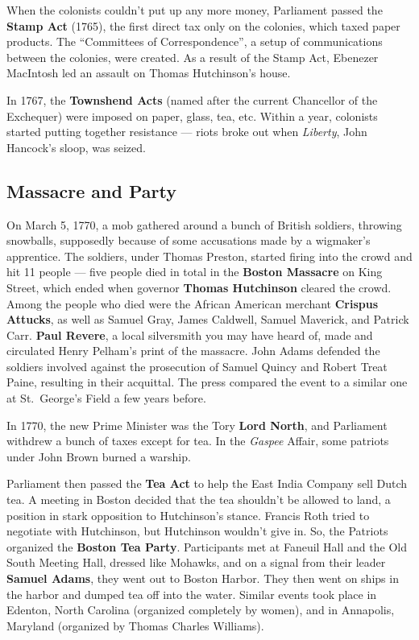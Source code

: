 When the colonists couldn't put up any more money,
Parliament passed the \textbf{Stamp Act} (1765),
the first direct tax only on the colonies, which taxed paper products.
The ``Committees of Correspondence'', a setup of communications between the colonies, were created.
As a result of the Stamp Act, Ebenezer MacIntosh led an assault on Thomas Hutchinson's house.

In 1767, the \textbf{Townshend Acts} (named after the current Chancellor of the Exchequer)
were imposed on paper, glass, tea, etc.
Within a year, colonists started putting together resistance ---
riots broke out when \textit{Liberty}, John Hancock's sloop, was seized.

\subsection*{Massacre and Party}

On March 5, 1770, a mob gathered around a bunch of British soldiers, throwing snowballs,
supposedly because of some accusations made by a wigmaker's apprentice.
The soldiers, under Thomas Preston, started firing into the crowd and hit 11 people ---
five people died in total in the \textbf{Boston Massacre} on King Street,
which ended when governor \textbf{Thomas Hutchinson} cleared the crowd.
Among the people who died were the African American merchant \textbf{Crispus Attucks},
as well as Samuel Gray, James Caldwell, Samuel Maverick, and Patrick Carr.
\textbf{Paul Revere}, a local silversmith you may have heard of,
made and circulated Henry Pelham's print of the massacre.
John Adams defended the soldiers involved against the prosecution of Samuel Quincy and Robert Treat Paine,
resulting in their acquittal.
The press compared the event to a similar one at St.\ George's Field a few years before.

In 1770, the new Prime Minister was the Tory \textbf{Lord North},
and Parliament withdrew a bunch of taxes except for tea.
In the \textit{Gaspee} Affair, some patriots under John Brown burned a warship.

Parliament then passed the \textbf{Tea Act} to help the East India Company sell Dutch tea.
A meeting in Boston decided that the tea shouldn't be allowed to land,
a position in stark opposition to Hutchinson's stance.
Francis Roth tried to negotiate with Hutchinson, but Hutchinson wouldn't give in.
So, the Patriots organized the \textbf{Boston Tea Party}.
Participants met at Faneuil Hall and the Old South Meeting Hall, dressed like Mohawks,
and on a signal from their leader \textbf{Samuel Adams}, they went out to Boston Harbor.
They then went on ships in the harbor and dumped tea off into the water.
Similar events took place in Edenton, North Carolina (organized completely by women),
and in Annapolis, Maryland (organized by Thomas Charles Williams).

